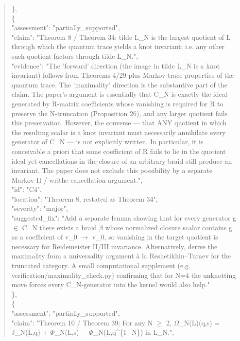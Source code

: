 \documentclass[11pt]{article}
\begin{document}
\begin{quote}
    \},\\
    \{\\
      "assessment": "partially\_supported",\\
      "claim": "Theorem 8 / Theorem 34: tilde L\_N is the largest quotient of L through which the quantum trace yields a knot invariant; i.e. any other such quotient factors through tilde L\_N.",\\
      "evidence": "The 'forward' direction (the image in tilde L\_N is a knot invariant) follows from Theorems 4/29 plus Markov-trace properties of the quantum trace. The 'maximality' direction is the substantive part of the claim. The paper's argument is essentially that C\_N is exactly the ideal generated by R-matrix coefficients whose vanishing is required for R to preserve the N-truncation (Proposition 26), and any larger quotient fails this preservation. However, the converse --- that ANY quotient in which the resulting scalar is a knot invariant must necessarily annihilate every generator of C\_N --- is not explicitly written. In particular, it is conceivable a priori that some coefficient of R fails to lie in the quotient ideal yet cancellations in the closure of an arbitrary braid still produce an invariant. The paper does not exclude this possibility by a separate Markov-II / writhe-cancellation argument.",\\
      "id": "C4",\\
      "location": "Theorem 8, restated as Theorem 34",\\
      "severity": "major",\\
      "suggested\_fix": "Add a separate lemma showing that for every generator g \ensuremath{\in} C\_N there exists a braid \ensuremath{\beta} whose normalized closure scalar contains g as a coefficient of v\_0 \ensuremath{\to} v\_0, so vanishing in the target quotient is necessary for Reidemeister II/III invariance. Alternatively, derive the maximality from a universality argument à la Reshetikhin--Turaev for the truncated category. A small computational supplement (e.g. verification/maximality\_check.py) confirming that for N=4 the unknotting move forces every C\_N-generator into the kernel would also help."\\
    \},\\
    \{\\
      "assessment": "partially\_supported",\\
      "claim": "Theorem 10 / Theorem 39: For any N \ensuremath{\ge} 2, \ensuremath{\Omega}\_N(L)(q,s) = J\_N(L,q) + \ensuremath{\Phi}\_N(L,s) \ensuremath{-} \ensuremath{\Phi}\_N(L,q\^{}\{1\ensuremath{-}N\}) in L\_N.",\\

\end{quote}
\end{document}
